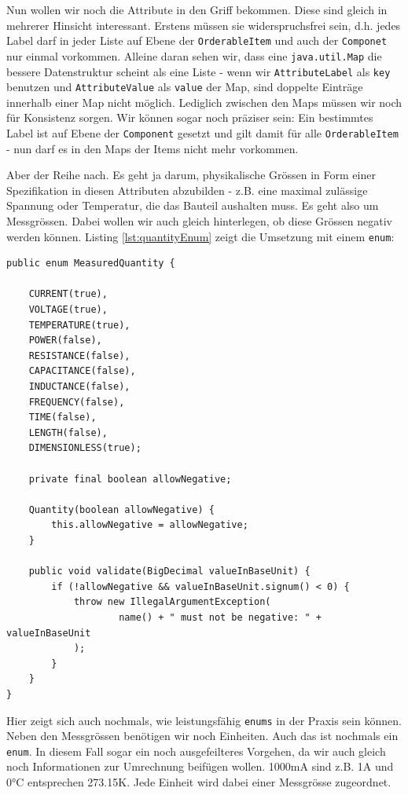 Nun wollen wir noch die Attribute in den Griff bekommen. Diese sind gleich in
mehrerer Hinsicht interessant. Erstens müssen sie widerspruchsfrei sein, d.h.
jedes Label darf in jeder Liste auf Ebene der \texttt{OrderableItem} 
und auch der \texttt{Componet} nur einmal vorkommen. Alleine daran sehen wir,
dass eine \texttt{java.util.Map} die bessere Datenstruktur scheint als eine 
Liste - wenn wir \texttt{AttributeLabel} als \texttt{key} benutzen und 
\texttt{AttributeValue} als \texttt{value} der Map, sind doppelte Einträge
innerhalb einer Map nicht möglich. Lediglich zwischen den Maps müssen wir noch
für Konsistenz sorgen. Wir können sogar noch präziser sein: Ein bestimmtes Label
ist auf Ebene der \texttt{Component} gesetzt und gilt damit für alle 
\texttt{OrderableItem} - nun darf es in den Maps der Items nicht mehr vorkommen.

Aber der Reihe nach. Es geht ja darum, physikalische Grössen in Form einer
Spezifikation in diesen Attributen abzubilden - z.B. eine maximal zulässige
Spannung oder Temperatur, die das Bauteil aushalten muss. Es geht also um 
Messgrössen. Dabei wollen wir auch gleich hinterlegen, ob diese Grössen 
negativ werden können. Listing \ref{lst:quantityEnum} zeigt die Umsetzung mit
einem \texttt{enum}:

\begin{listing}[H]
\begin{verbatim}
public enum MeasuredQuantity {

    CURRENT(true),
    VOLTAGE(true),
    TEMPERATURE(true),
    POWER(false),
    RESISTANCE(false),
    CAPACITANCE(false),
    INDUCTANCE(false),
    FREQUENCY(false),
    TIME(false),
    LENGTH(false),
    DIMENSIONLESS(true);

    private final boolean allowNegative;

    Quantity(boolean allowNegative) {
        this.allowNegative = allowNegative;
    }

    public void validate(BigDecimal valueInBaseUnit) {
        if (!allowNegative && valueInBaseUnit.signum() < 0) {
            throw new IllegalArgumentException(
                    name() + " must not be negative: " + valueInBaseUnit
            );
        }
    }
}
\end{verbatim}
\caption{MeasuredQuantity enum inkl. der Abbildung von Zahlenranges}
\label{lst:quantityEnum}
\end{listing}

Hier zeigt sich auch nochmals, wie leistungsfähig \texttt{enums} in der Praxis
sein können. Neben den Messgrössen benötigen wir noch Einheiten. Auch das ist
nochmals ein \texttt{enum}. In diesem Fall sogar ein noch ausgefeilteres
Vorgehen, da
wir auch gleich noch Informationen zur Umrechnung beifügen wollen. 1000mA sind 
z.B. 1A und 0°C entsprechen 273.15K. Jede Einheit wird dabei einer Messgrösse
zugeordnet.

